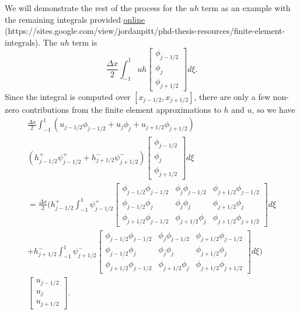 We will demonstrate the rest of the process for the $uh$ term as an example with the remaining integrals provided \href{https://sites.google.com/view/jordanpitt/phd-thesis-resources/finite-element-integrals}{\color{blue}\underline{online}} (https://sites.google.com/view/jordanpitt/phd-thesis-resources/finite-element-integrals).
The $uh$ term is 
\begin{equation*}
\frac{\Delta x}{2}\int_{-1 }^{1}  uh \begin{bmatrix}
\phi_{j-1/2}\\\phi_j \\\phi_{j+1/2}
\end{bmatrix} d\xi.
\end{equation*}
Since the integral is computed over $\left[x_{j-1/2},x_{j+1/2}\right]$, there are only a few non-zero contributions from the finite element approximations to $h$ and $u$, so we have
\begin{multline*}
\frac{\Delta x}{2}\int_{-1 }^{1}  \left(u_{j-1/2}\phi_{j-1/2} + u_{j}\phi_{j} + u_{j+1/2}\phi_{j+1/2}\right) \\\left(h^+_{j-1/2}\psi^+_{j-1/2}  + h^-_{j+1/2}\psi^-_{j+1/2}\right) \begin{bmatrix}
\phi_{j-1/2}\\\phi_j \\\phi_{j+1/2}
\end{bmatrix} d\xi\\
=\frac{\Delta x}{2}\Bigg( h^+_{j-1/2} \int_{-1 }^{1} \psi^+_{j-1/2}  \begin{bmatrix}
\phi_{j-1/2} \phi_{j-1/2} & \phi_{j}  \phi_{j-1/2}  & \phi_{j+1/2} \phi_{j-1/2}\\\phi_{j-1/2} \phi_{j} & \phi_{j} \phi_{j} &  \phi_{j + 1/2} \phi_{j}\\\phi_{j+1/2} \phi_{j-1/2} &  \phi_{j+1/2} \phi_{j} & \phi_{j+1/2} \phi_{j+1/2}
\end{bmatrix} d\xi  \\ +  h^-_{j+1/2}\int_{-1 }^{1} \psi^-_{j+1/2} \begin{bmatrix}
\phi_{j-1/2} \phi_{j-1/2} & \phi_{j}  \phi_{j-1/2}  & \phi_{j+1/2} \phi_{j-1/2}\\\phi_{j-1/2} \phi_{j} & \phi_{j} \phi_{j} &  \phi_{j + 1/2} \phi_{j}\\\phi_{j+1/2} \phi_{j-1/2} &  \phi_{j+1/2} \phi_{j} & \phi_{j+1/2} \phi_{j+1/2}
\end{bmatrix} d\xi \Bigg) \\  \begin{bmatrix}
u_{j-1/2}\\u_j \\u _{j+1/2}
\end{bmatrix}.
\end{multline*}

